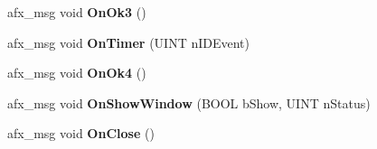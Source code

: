 \begin{DoxyCompactItemize}
\item 
\hypertarget{class_c_msg_box_a03464dc209beb501379dba1728258a55}{afx\-\_\-msg void {\bfseries On\-Ok3} ()}\label{class_c_msg_box_a03464dc209beb501379dba1728258a55}

\item 
\hypertarget{class_c_msg_box_ae449f89997564773da7060725ab8c691}{afx\-\_\-msg void {\bfseries On\-Timer} (U\-I\-N\-T n\-I\-D\-Event)}\label{class_c_msg_box_ae449f89997564773da7060725ab8c691}

\item 
\hypertarget{class_c_msg_box_a03aebefd860fb2ea9dbd0c67b41cd4ea}{afx\-\_\-msg void {\bfseries On\-Ok4} ()}\label{class_c_msg_box_a03aebefd860fb2ea9dbd0c67b41cd4ea}

\item 
\hypertarget{class_c_msg_box_a125cf528fea5430b664830fd04716f40}{afx\-\_\-msg void {\bfseries On\-Show\-Window} (B\-O\-O\-L b\-Show, U\-I\-N\-T n\-Status)}\label{class_c_msg_box_a125cf528fea5430b664830fd04716f40}

\item 
\hypertarget{class_c_msg_box_adc6f7d305e10dba7fad2092cb2872afa}{afx\-\_\-msg void {\bfseries On\-Close} ()}\label{class_c_msg_box_adc6f7d305e10dba7fad2092cb2872afa}

\end{DoxyCompactItemize}
